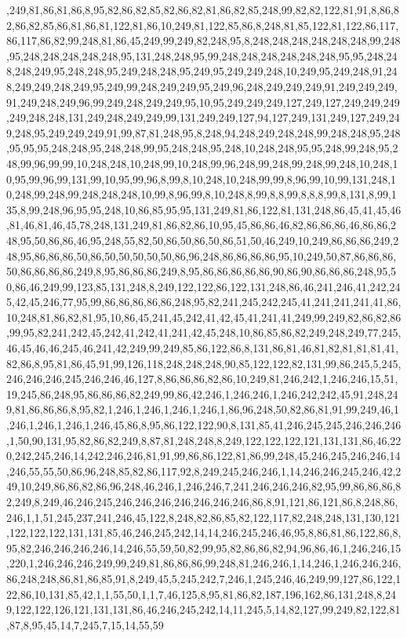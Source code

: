 ,249,81,86,81,86,8,95,82,86,82,85,82,86,82,81,86,82,85,248,99,82,82,122,81,91,8,86,82,86,82,85,86,81,86,81,122,81,86,10,249,81,122,85,86,8,248,81,85,122,81,122,86,117,86,117,86,82,99,248,81,86,45,249,99,249,82,248,95,8,248,248,248,248,248,248,99,248,95,248,248,248,248,248,95,131,248,248,95,99,248,248,248,248,248,248,95,95,248,248,248,249,95,248,248,95,249,248,248,95,249,95,249,249,248,10,249,95,249,248,91,248,249,249,248,249,95,249,99,248,249,249,95,249,96,248,249,249,249,91,249,249,249,91,249,248,249,96,99,249,248,249,249,95,10,95,249,249,249,127,249,127,249,249,249,249,248,248,131,249,248,249,249,99,131,249,249,127,94,127,249,131,249,127,249,249,248,95,249,249,249,91,99,87,81,248,95,8,248,94,248,249,248,248,99,248,248,95,248,95,95,95,248,248,95,248,248,99,95,248,248,95,248,10,248,248,95,95,248,99,248,95,248,99,96,99,99,10,248,248,10,248,99,10,248,99,96,248,99,248,99,248,99,248,10,248,10,95,99,96,99,131,99,10,95,99,96,8,99,8,10,248,10,248,99,99,8,96,99,10,99,131,248,10,248,99,248,99,248,248,248,10,99,8,96,99,8,10,248,8,99,8,8,99,8,8,8,99,8,131,8,99,135,8,99,248,96,95,95,248,10,86,85,95,95,131,249,81,86,122,81,131,248,86,45,41,45,46,81,46,81,46,45,78,248,131,249,81,86,82,86,10,95,45,86,86,46,82,86,86,86,46,86,86,248,95,50,86,86,46,95,248,55,82,50,86,50,86,50,86,51,50,46,249,10,249,86,86,86,249,248,95,86,86,86,50,86,50,50,50,50,50,86,96,248,86,86,86,86,95,10,249,50,87,86,86,86,50,86,86,86,86,249,8,95,86,86,86,249,8,95,86,86,86,86,86,90,86,90,86,86,86,248,95,50,86,46,249,99,123,85,131,248,8,249,122,122,86,122,131,248,86,46,241,246,41,242,245,42,45,246,77,95,99,86,86,86,86,86,248,95,82,241,245,242,245,41,241,241,241,41,86,10,248,81,86,82,81,95,10,86,45,241,45,242,41,42,45,41,241,41,249,99,249,82,86,82,86,99,95,82,241,242,45,242,41,242,41,241,42,45,248,10,86,85,86,82,249,248,249,77,245,46,45,46,46,245,46,241,42,249,99,249,85,86,122,86,8,131,86,81,46,81,82,81,81,81,41,82,86,8,95,81,86,45,91,99,126,118,248,248,248,90,85,122,122,82,131,99,86,245,5,245,246,246,246,245,246,246,46,127,8,86,86,86,82,86,10,249,81,246,242,1,246,246,15,51,19,245,86,248,95,86,86,86,82,249,99,86,42,246,1,246,246,1,246,242,242,45,91,248,249,81,86,86,86,8,95,82,1,246,1,246,1,246,1,246,1,86,96,248,50,82,86,81,91,99,249,46,1,246,1,246,1,246,1,246,45,86,8,95,86,122,122,90,8,131,85,41,246,245,245,246,246,246,1,50,90,131,95,82,86,82,249,8,87,81,248,248,8,249,122,122,122,121,131,131,86,46,220,242,245,246,14,242,246,246,81,91,99,86,86,122,81,86,99,248,45,246,245,246,246,14,246,55,55,50,86,96,248,85,82,86,117,92,8,249,245,246,246,1,14,246,246,245,246,42,249,10,249,86,86,82,86,96,248,46,246,1,246,246,7,241,246,246,246,82,95,99,86,86,86,82,249,8,249,46,246,245,246,246,246,246,246,246,246,86,8,91,121,86,121,86,8,248,86,246,1,1,51,245,237,241,246,45,122,8,248,82,86,85,82,122,117,82,248,248,131,130,121,122,122,122,131,131,85,46,246,245,242,14,14,246,245,246,46,95,8,86,81,86,122,86,8,95,82,246,246,246,246,14,246,55,59,50,82,99,95,82,86,86,82,94,96,86,46,1,246,246,15,220,1,246,246,246,249,99,249,81,86,86,86,99,248,81,246,246,1,14,246,1,246,246,246,86,248,248,86,81,86,85,91,8,249,45,5,245,242,7,246,1,245,246,46,249,99,127,86,122,122,86,10,131,85,42,1,1,55,50,1,1,7,46,125,8,95,81,86,82,187,196,162,86,131,248,8,249,122,122,126,121,131,131,86,46,246,245,242,14,11,245,5,14,82,127,99,249,82,122,81,87,8,95,45,14,7,245,7,15,14,55,59